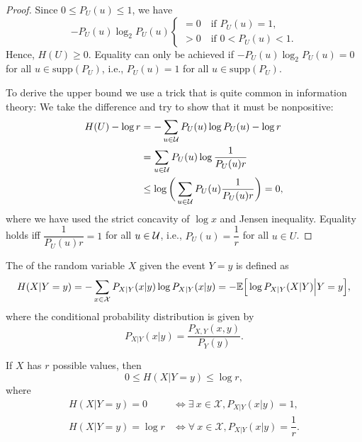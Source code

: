 \documentclass[11pt,a4paper]{article}
\begin{document}
\begin{proof}
    Since $0\le P_U(u) \le 1$, we have 
    \begin{equation*}
        -P_U(u)\log_2 P_U(u) \begin{cases}
            = 0\quad \text{if } P_U(u) = 1,\\
            > 0\quad \text{if } 0 < P_U(u) < 1.
        \end{cases}
    \end{equation*}
    Hence, $H(U) \ge 0$. Equality can only be achieved if $-P_U(u)\log_2 P_U(u) = 0$ for all $u\in \text{supp}(P_U)$, i.e., $P_U(u) = 1$ for all $u\in \text{supp}(P_U)$.

    To derive the upper bound we use a trick that is quite common in information theory: We take the difference and try to show that it must be nonpositive:
    \begin{align*}
        H(U) - \log r &= - \sum_{u\in\mathcal{U}} P_U(u)\log P_U(u) - \log r \\
        &= \sum_{u\in\mathcal{U}} P_U(u)\log \dfrac{1}{P_U(u) r} \\
        &\le \log\bigg( \sum_{u\in\mathcal{U}} P_U(u) \dfrac{1}{P_U(u) r} \bigg) = 0,
    \end{align*}
    where we have used the strict concavity of $\log x$ and Jensen inequality. Equality holds iff $\dfrac{1}{P_U(u) r} = 1$ for all $u\in \mathcal{U}$, i.e., $P_U(u) = \dfrac{1}{r}$ for all $u\in U$.
\end{proof}

\begin{definition}
    The  of the random variable $X$ given the event $Y = y$ is defined as 
    \begin{equation*}
        H(X|Y = y) = -\sum_{x\in \mathcal{X}} P_{X|Y}(x|y) \log P_{X|Y}(x|y) = -\mathbb{E}\Big[\log P_{X|Y}(X|Y)\Big| Y = y \Big],
    \end{equation*}
    where the conditional probability distribution is given by
    \begin{equation*}
        P_{X|Y}(x|y) = \dfrac{P_{X,Y}(x,y)}{P_Y(y)}.
    \end{equation*}
\end{definition}

\begin{corollary}
    If $X$ has $r$ possible values, then 
    \begin{equation*}
        0 \le H(X|Y = y)\le \log r,
    \end{equation*}
    where 
    \begin{align*}
        H(X|Y = y) = 0\quad &\iff \exists\ x\in\mathcal{X}, P_{X|Y}(x|y) = 1, \\
        H(X|Y = y) = \log r &\iff \forall\ x\in\mathcal{X}, P_{X|Y}(x|y) = \dfrac{1}{r}.
    \end{align*}
\end{corollary}
\end{document}
